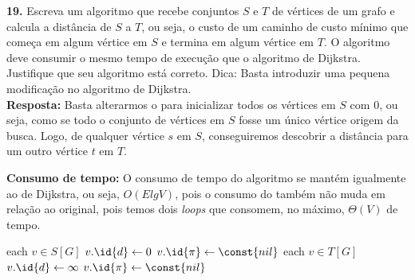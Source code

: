 
\noindent\textbf{19.} Escreva um algoritmo que recebe conjuntos $S$ e $T$ de vértices de um grafo e calcula a distância de $S$ a $T$, ou seja, o custo de um caminho de custo mínimo que começa em algum vértice em $S$ e termina em algum vértice em $T$. O algoritmo deve consumir o mesmo tempo de execução que o algoritmo de Dijkstra. Justifique que seu algoritmo está correto. Dica: Basta introduzir uma pequena modificação no algoritmo de Dijkstra.\\[6pt]
\textbf{Resposta:} Basta alterarmos o  para inicializar todos os vértices em $S$ com 0, ou seja, como se todo o conjunto de vértices em $S$ fosse um único vértice origem da busca. Logo, de qualquer vértice $s$ em $S$, conseguiremos descobrir a distância para um outro vértice $t$ em $T$.

\textbf{Consumo de tempo:} O consumo de tempo do algoritmo se mantém igualmente ao de Dijkstra, ou seja, $O(E lg V)$, pois o consumo do  também não muda em relação ao original, pois temos dois \textit{loops} que consomem, no máximo, $\Theta(V)$ de tempo.

\begin{codebox}
\li \For each $v \in S[G]$
\li \Do
        $v.\id{d} \gets 0$
\li     $v.\id{\pi} \gets \const{nil}$
    \End
\li \For each $v \in T[G]$
\li \Do
        $v.\id{d} \gets \infty$
\li     $v.\id{\pi} \gets \const{nil}$
    \End
\end{codebox}